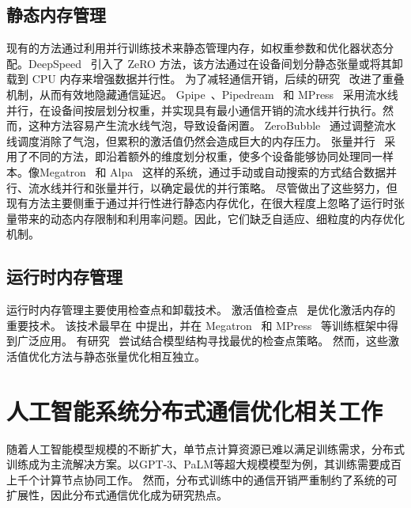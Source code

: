 \subsection{静态内存管理}
现有的方法通过利用并行训练技术来静态管理内存，如权重参数和优化器状态分配。DeepSpeed~\cite{singh2023deepspeed-ted,rasley2020DeepSpeed,raj2021zeroinfinity} 引入了 ZeRO 方法，该方法通过在设备间划分静态张量或将其卸载到 CPU 内存来增强数据并行性。
为了减轻通信开销，后续的研究~\cite{Centauri,better-together} 改进了重叠机制，从而有效地隐藏通信延迟。
Gpipe~\cite{huang2019gpipe}、Pipedream~\cite{narayanan2019pipedream} 和 MPress~\cite{zhou2023mpress} 采用流水线并行，在设备间按层划分权重，并实现具有最小通信开销的流水线并行执行。然而，这种方法容易产生流水线气泡，导致设备闲置。
ZeroBubble~\cite{zero-bubble} 通过调整流水线调度消除了气泡，但累积的激活值仍然会造成巨大的内存压力。
张量并行~\cite{krothikanti2022megatronv3,flux,transformer_engine} 采用了不同的方法，即沿着额外的维度划分权重，使多个设备能够协同处理同一样本。像Megatron~\cite{shoeybi2019megatron,krothikanti2022megatronv3} 和 Alpa~\cite{zheng2022alpa,zhuang2022alpacomm} 这样的系统，通过手动或自动搜索的方式结合数据并行、流水线并行和张量并行，以确定最优的并行策略。
尽管做出了这些努力，但现有方法主要侧重于通过并行性进行静态内存优化，在很大程度上忽略了运行时张量带来的动态内存限制和利用率问题。因此，它们缺乏自适应、细粒度的内存优化机制。

\subsection{运行时内存管理}
运行时内存管理主要使用检查点和卸载技术。
激活值检查点~\cite{cybertronai_gradient_checkpointing} 是优化激活内存的重要技术。
该技术最早在\cite{chen2016recomp} 中提出，并在 Megatron~\cite{krothikanti2022megatronv3} 和 MPress~\cite{zhou2023mpress} 等训练框架中得到广泛应用。
有研究~\cite{jain2020checkmate} 尝试结合模型结构寻找最优的检查点策略。
然而，这些激活值优化方法与静态张量优化相互独立。 







\section{人工智能系统分布式通信优化相关工作}

随着人工智能模型规模的不断扩大，单节点计算资源已难以满足训练需求，分布式训练成为主流解决方案。以GPT-3、PaLM等超大规模模型为例，其训练需要成百上千个计算节点协同工作。
然而，分布式训练中的通信开销严重制约了系统的可扩展性，因此分布式通信优化成为研究热点。

